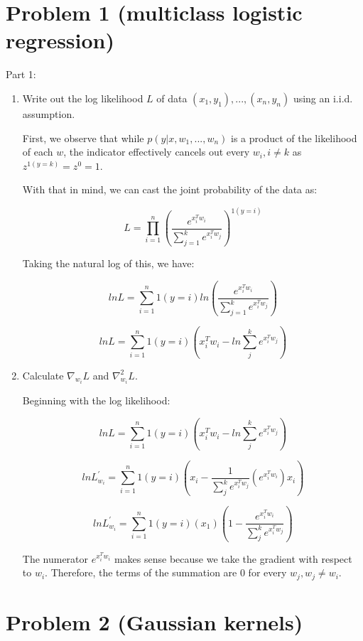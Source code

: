 \documentclass[11pt]{article}
\begin{document}

\section*{Problem 1 (multiclass logistic regression)}

Part 1:
\begin{enumerate}
\item Write out the log likelihood $L$ of data $(x_1, y_1), . . . , (x_n, y_n)$ using an i.i.d. assumption.

First, we observe that while $p(y|x, w_1, ..., w_n)$ is a product of the likelihood of each $w$, the indicator effectively cancels out every $w_i, i \neq k$ as $z^{1(y = k)} = z^0 = 1$.

With that in mind, we can cast the joint probability of the data as:

\[
L = \prod_{i=1}^{n} (\frac{e^{x_i^Tw_i}}{\sum_{j=1}^k e^{x_i^Tw_j}})^{1(y = i)}
\]

Taking the natural log of this, we have:

\[
lnL = \sum_{i=1}^{n} 1(y = i) ln(\frac{e^{x_i^Tw_i}}{\sum_{j=1}^k e^{x_i^Tw_j}})
\]

\[
lnL = \sum_{i=1}^{n} 1(y = i) (x_i^Tw_i - ln{\sum_j^k e^{x_i^Tw_j}})
\]

\item Calculate $\nabla_{w_i} L$ and $\nabla^2_{w_i} L$.

Beginning with the log likelihood:

\[
lnL = \sum_{i=1}^{n} 1(y = i) (x_i^Tw_i - ln{\sum_j^k e^{x_i^Tw_j}})
\]

\[
lnL_{w_i}^\prime = \sum_{i=1}^{n} 1(y = i) (x_i - \frac{1}{\sum_j^k e^{x_i^Tw_j}} (e^{x_i^Tw_i}) x_i)
\]

\[
lnL_{w_i}^\prime = \sum_{i=1}^{n} 1(y = i)(x_1) (1 - \frac{e^{x_i^Tw_i}}{\sum_j^k e^{x_i^Tw_j}})
\]

The numerator $e^{x_i^Tw_i}$ makes sense because we take the gradient with respect to $w_i$. Therefore, the terms of the summation are 0 for every $w_j, w_j \neq w_i$.

\end{enumerate}

\section*{Problem 2 (Gaussian kernels)}
\end{document}
